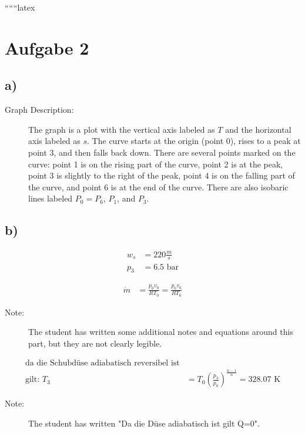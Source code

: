 
``````latex


\section*{Aufgabe 2}

\subsection*{a)}

\begin{description}
    \item[Graph Description:] The graph is a plot with the vertical axis labeled as $T$ and the horizontal axis labeled as $s$. The curve starts at the origin (point 0), rises to a peak at point 3, and then falls back down. There are several points marked on the curve: point 1 is on the rising part of the curve, point 2 is at the peak, point 3 is slightly to the right of the peak, point 4 is on the falling part of the curve, and point 6 is at the end of the curve. There are also isobaric lines labeled $P_0 = P_6$, $P_1$, and $P_3$.
\end{description}

\subsection*{b)}

\begin{align*}
    w_s &= 220 \frac{m}{s} \\
    p_3 &= 6.5 \text{ bar}
\end{align*}

\begin{align*}
    \dot{m} &= \frac{p_0 v_0}{R T_0} = \frac{p_0 v_6}{R T_6}
\end{align*}

\begin{description}
    \item[Note:] The student has written some additional notes and equations around this part, but they are not clearly legible.
\end{description}

\begin{align*}
    \text{da die Schubdüse adiabatisch reversibel ist} \\
    \text{gilt: } T_3 &= T_0 \left( \frac{p_3}{p_0} \right)^{\frac{n-1}{n}} = 328.07 \text{ K}
\end{align*}

\begin{description}
    \item[Note:] The student has written "Da die Düse adiabatisch ist gilt Q=0".
\end{description}

